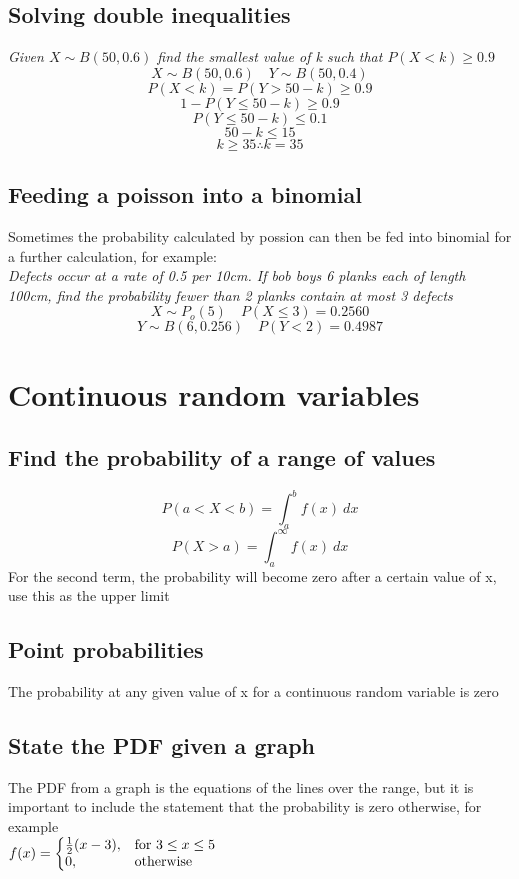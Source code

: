 \documentclass{article}[18pt]
\begin{document}
\subsection{Solving double inequalities}
\textit{Given $X\sim B(50,0.6)$ find the smallest value of k such that $P(X<k)\geqslant0.9$}
$$X\sim B(50,0.6) \quad Y\sim B(50,0.4)$$
$$P(X<k)=P(Y>50-k)\geqslant0.9$$
$$1-P(Y\leqslant 50-k)\geqslant 0.9$$
$$P(Y\leqslant50-k)\leqslant0.1$$
$$50-k\leqslant15$$
$$k\geqslant35 \therefore k=35$$
\newpage
\subsection{Feeding a poisson into a binomial}
Sometimes the probability calculated by possion can then be fed into binomial for a further calculation, for example:\\
\textit{Defects occur at a rate of 0.5 per 10cm. If bob boys 6 planks each of length 100cm, find the probability fewer than 2 planks contain at most 3 defects}
$$X\sim P_o(5) \quad P(X\leqslant3)=0.2560$$
$$Y\sim B(6,0.256) \quad P(Y<2)=0.4987$$
\section{Continuous random variables}
\subsection{Find the probability of a range of values}
$$P(a<X<b)=\int^b_a f(x) \ dx$$
$$P(X>a)=\int^\infty_a f(x) \ dx$$
For the second term, the probability will become zero after a certain value of x, use this as the upper limit
\subsection{Point probabilities}
The probability at any given value of x for a continuous random variable is zero
\subsection{State the PDF given a graph}
The PDF from a graph is the equations of the lines over the range, but it is important to include the statement that the probability is zero otherwise, for example\\
$
  f(x)=\left\{
  \begin{array}{@{}ll@{}}
    \frac{1}{2}(x-3), & \text{for}\ 3\leq x \leq 5  \\
    0, & \text{otherwise}
  \end{array}\right.
$
\end{document}
